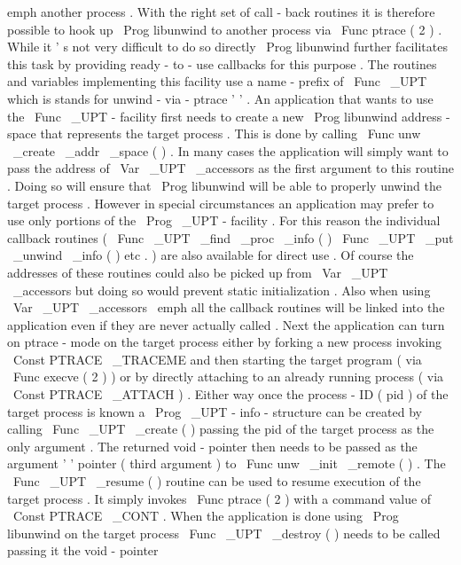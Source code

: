 emph
{
another
}
process
.
With
the
right
set
of
call
-
back
routines
it
is
therefore
possible
to
hook
up
\
Prog
{
libunwind
}
to
another
process
via
\
Func
{
ptrace
}
(
2
)
.
While
it
'
s
not
very
difficult
to
do
so
directly
\
Prog
{
libunwind
}
further
facilitates
this
task
by
providing
ready
-
to
-
use
callbacks
for
this
purpose
.
The
routines
and
variables
implementing
this
facility
use
a
name
-
prefix
of
\
Func
{
\
_UPT
}
which
is
stands
for
unwind
-
via
-
ptrace
'
'
.
An
application
that
wants
to
use
the
\
Func
{
\
_UPT
}
-
facility
first
needs
to
create
a
new
\
Prog
{
libunwind
}
address
-
space
that
represents
the
target
process
.
This
is
done
by
calling
\
Func
{
unw
\
_create
\
_addr
\
_space
}
(
)
.
In
many
cases
the
application
will
simply
want
to
pass
the
address
of
\
Var
{
\
_UPT
\
_accessors
}
as
the
first
argument
to
this
routine
.
Doing
so
will
ensure
that
\
Prog
{
libunwind
}
will
be
able
to
properly
unwind
the
target
process
.
However
in
special
circumstances
an
application
may
prefer
to
use
only
portions
of
the
\
Prog
{
\
_UPT
}
-
facility
.
For
this
reason
the
individual
callback
routines
(
\
Func
{
\
_UPT
\
_find
\
_proc
\
_info
}
(
)
\
Func
{
\
_UPT
\
_put
\
_unwind
\
_info
}
(
)
etc
.
)
are
also
available
for
direct
use
.
Of
course
the
addresses
of
these
routines
could
also
be
picked
up
from
\
Var
{
\
_UPT
\
_accessors
}
but
doing
so
would
prevent
static
initialization
.
Also
when
using
\
Var
{
\
_UPT
\
_accessors
}
\
emph
{
all
}
the
callback
routines
will
be
linked
into
the
application
even
if
they
are
never
actually
called
.
Next
the
application
can
turn
on
ptrace
-
mode
on
the
target
process
either
by
forking
a
new
process
invoking
\
Const
{
PTRACE
\
_TRACEME
}
and
then
starting
the
target
program
(
via
\
Func
{
execve
}
(
2
)
)
or
by
directly
attaching
to
an
already
running
process
(
via
\
Const
{
PTRACE
\
_ATTACH
}
)
.
Either
way
once
the
process
-
ID
(
pid
)
of
the
target
process
is
known
a
\
Prog
{
\
_UPT
}
-
info
-
structure
can
be
created
by
calling
\
Func
{
\
_UPT
\
_create
}
(
)
passing
the
pid
of
the
target
process
as
the
only
argument
.
The
returned
void
-
pointer
then
needs
to
be
passed
as
the
argument
'
'
pointer
(
third
argument
)
to
\
Func
{
unw
\
_init
\
_remote
}
(
)
.
The
\
Func
{
\
_UPT
\
_resume
}
(
)
routine
can
be
used
to
resume
execution
of
the
target
process
.
It
simply
invokes
\
Func
{
ptrace
}
(
2
)
with
a
command
value
of
\
Const
{
PTRACE
\
_CONT
}
.
When
the
application
is
done
using
\
Prog
{
libunwind
}
on
the
target
process
\
Func
{
\
_UPT
\
_destroy
}
(
)
needs
to
be
called
passing
it
the
void
-
pointer

